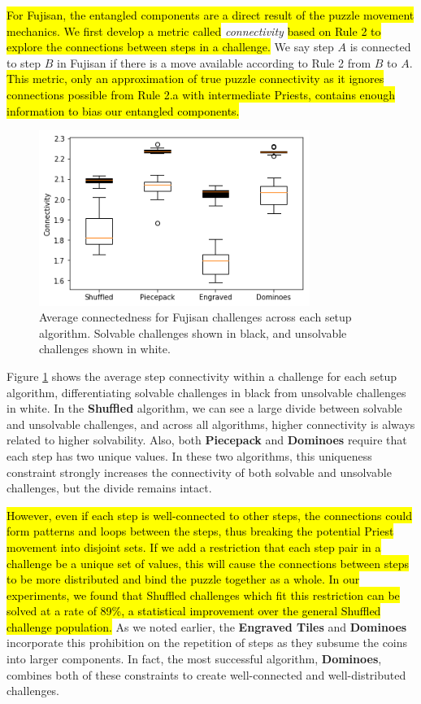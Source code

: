 \documentclass[journal]{IEEEtran}
\begin{document}
\hl{For Fujisan, the entangled components are a direct result of the puzzle movement mechanics. We first develop a metric called} {\it connectivity} \hl{based on Rule 2 to explore the connections between steps in a challenge.} We say step $A$ is connected to step $B$ in Fujisan if there is a move available according to Rule 2 from $B$ to $A$. \hl{This metric, only an approximation of true puzzle connectivity as it ignores connections possible from Rule 2.a with intermediate Priests, contains enough information to bias our entangled components.}

\begin{figure}[t]
\includegraphics[width=8.8cm]{figure19.png}
\caption{Average connectedness for Fujisan challenges across each setup algorithm. 
Solvable challenges shown in black, and unsolvable challenges shown in white.}
\label{fig:connected}
\end{figure}



Figure \ref{fig:connected} shows the average step connectivity within a challenge for each setup algorithm, differentiating solvable challenges in black from unsolvable challenges in white. 
In the \textbf{Shuffled} algorithm, we can see a large divide between solvable and unsolvable challenges, and across all algorithms, higher connectivity is always related to higher solvability. Also, both \textbf{Piecepack} and \textbf{Dominoes} require that each step has two unique values. In these two algorithms, this uniqueness constraint strongly increases the connectivity of both solvable and unsolvable challenges, but the divide remains intact.

\hl{However, even if each step is well-connected to other steps, the connections could form patterns and loops between the steps, thus breaking the potential Priest movement into disjoint sets. If we add a restriction that each step pair in a challenge be a unique set of values, this will cause the connections between steps to be more distributed and bind the puzzle together as a whole. In our experiments, we found that Shuffled challenges which fit this restriction can be solved at a rate of 89\%, a statistical improvement over the general Shuffled challenge population.} As we noted earlier, the {\bf Engraved Tiles} and {\bf Dominoes} incorporate this prohibition on the repetition of steps as they subsume the coins into larger components. In fact, the most successful algorithm, {\bf Dominoes}, combines both of these constraints to create well-connected and well-distributed challenges.
\end{document}
